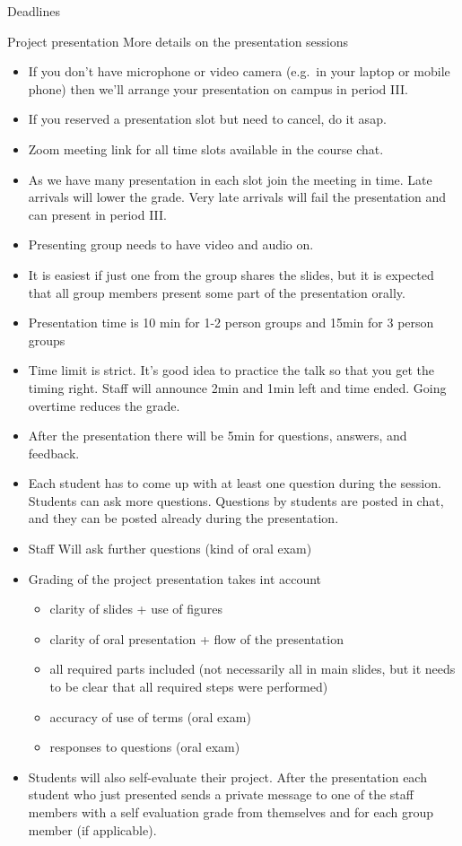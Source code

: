\documentclass[
  13pt,
  ignorenonframetext,
]{beamer}
\providecommand{\tightlist}{%
  \setlength{\itemsep}{0pt}\setlength{\parskip}{0pt}}
\begin{document}
\begin{frame}[fragile]{Deadlines}
\begin{block}{Project presentation}
More details on the presentation sessions

\begin{itemize}
\tightlist
\item
  If you don't have microphone or video camera (e.g.~in your laptop or
  mobile phone) then we'll arrange your presentation on campus in period
  III.
\item
  If you reserved a presentation slot but need to cancel, do it asap.
\item
  Zoom meeting link for all time slots available in the course chat.
\item
  As we have many presentation in each slot join the meeting in time.
  Late arrivals will lower the grade. Very late arrivals will fail the
  presentation and can present in period III.
\item
  Presenting group needs to have video and audio on.
\item
  It is easiest if just one from the group shares the slides, but it is
  expected that all group members present some part of the presentation
  orally.
\item
  Presentation time is 10 min for 1-2 person groups and 15min for 3
  person groups
\item
  Time limit is strict. It's good idea to practice the talk so that you
  get the timing right. Staff will announce 2min and 1min left and time
  ended. Going overtime reduces the grade.
\item
  After the presentation there will be 5min for questions, answers, and
  feedback.
\item
  Each student has to come up with at least one question during the
  session. Students can ask more questions. Questions by students are
  posted in chat, and they can be posted already during the
  presentation.
\item
  Staff Will ask further questions (kind of oral exam)
\item
  Grading of the project presentation takes int account

  \begin{itemize}
  \tightlist
  \item
    clarity of slides + use of figures
  \item
    clarity of oral presentation + flow of the presentation
  \item
    all required parts included (not necessarily all in main slides, but
    it needs to be clear that all required steps were performed)
  \item
    accuracy of use of terms (oral exam)
  \item
    responses to questions (oral exam)
  \end{itemize}
\item
  Students will also self-evaluate their project. After the presentation
  each student who just presented sends a private message to one of the
  staff members with a self evaluation grade from themselves and for
  each group member (if applicable).
\end{itemize}
\end{block}


\end{frame}
\end{document}
